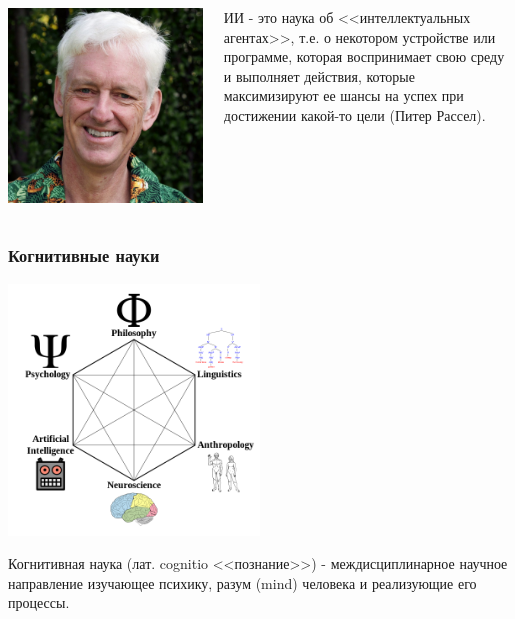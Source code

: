 \documentclass[default]{beamer}
\begin{document}
\begin{frame}
{\begin{columns}
\begin{column}{0.2\textwidth}
					\includegraphics[width=\textwidth]{norvig.jpg}
				\end{column}
				\begin{column}{0.8\textwidth}
					ИИ - это наука об <<интеллектуальных агентах>>, т.е. о некотором устройстве или программе, которая воспринимает свою среду и выполняет действия, которые максимизируют ее шансы на успех при достижении какой-то цели (Питер Рассел).
				\end{column}
			\end{columns}
		}
	\end{frame}
	

	\begin{frame}
		\frametitle{Когнитивные науки}
		
		
		\centering
		\includegraphics[width=0.5\textwidth]{cogsci.png}
		
		Когнитивная наука (лат. cognitio <<познание>>) - междисциплинарное научное направление изучающее психику, разум (mind) человека и реализующие его процессы.
	\end{frame}
\end{document}
